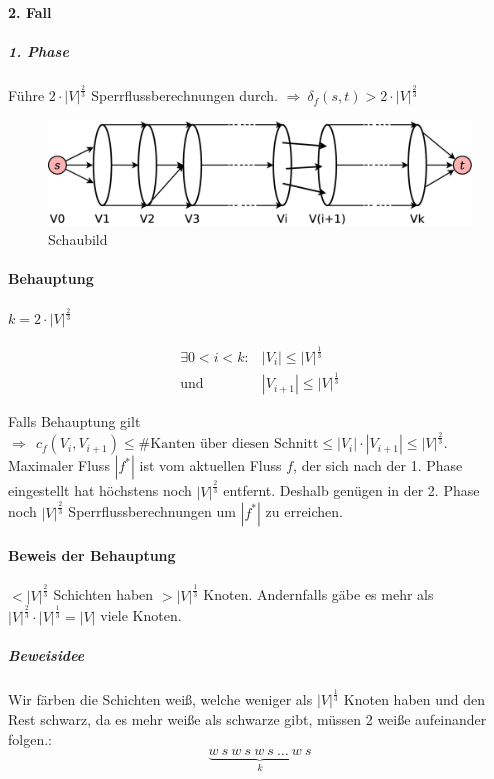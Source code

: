 \paragraph{2. Fall}
\subparagraph{1. Phase} Führe $2\cdot |V|^\frac{2}{3}$ Sperrflussberechnungen durch.
$\Rightarrow~\delta_f(s,t)>2\cdot|V|^\frac{2}{3}$
\begin{figure}[h]
\centering
\includegraphics[width=\linewidth]{28/Grafik/Diagramm1}
\caption{Schaubild}
\label{fig:Diagramm1}
\end{figure}
\paragraph{Behauptung}
\begin{flushright}
	$k=2\cdot|V|^\frac{2}{3}$
\end{flushright}
\begin{align*}
 \exists 0<i<k:&|V_i|\leq |V|^\frac{1}{3}\\
 \text{und }&|V_{i+1}|\leq |V|^\frac{1}{3}
\end{align*}

Falls Behauptung gilt $\Rightarrow ~~c_f(V_i,V_{i+1}) \leq \#\text{Kanten über diesen Schnitt}\leq |V_i|\cdot|V_{i+1}| \leq|V|^\frac{2}{3}$. Maximaler Fluss $|f^*|$ ist vom aktuellen Fluss $f$, der sich nach der 1. Phase eingestellt hat höchstens noch $|V|^\frac{2}{3}$ entfernt. Deshalb genügen in der 2. Phase noch $|V|^\frac{2}{3}$ Sperrflussberechnungen um $|f^*|$ zu erreichen.
\pagebreak
\paragraph{Beweis der Behauptung}
$<|V|^\frac{2}{3}$ Schichten haben $>|V|^\frac{1}{3}$ Knoten. Andernfalls gäbe es mehr als $|V|^\frac{2}{3}\cdot|V|^\frac{1}{3}=|V|$ viele Knoten.
\subparagraph{Beweisidee}
Wir färben die Schichten weiß, welche weniger als $|V|^\frac{1}{3}$ Knoten haben und den Rest schwarz, da es mehr weiße als schwarze gibt, müssen 2 weiße aufeinander folgen.:
\[ \underset{k}{\underbrace{w~s~w~s~w~s~\ldots~w~s}} \]

